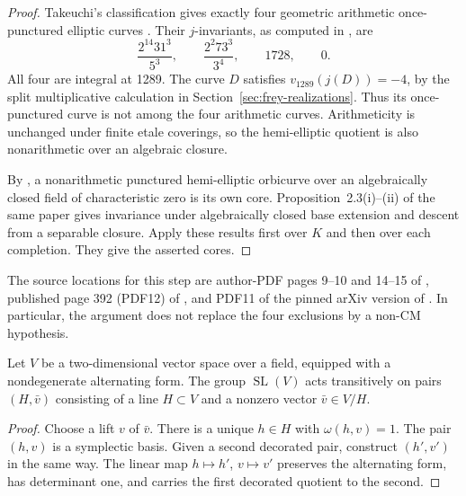 \begin{proof}
Takeuchi's classification gives exactly four geometric arithmetic
once-punctured elliptic curves
\cite[Theorem~4.1(i)]{TakeuchiFuchsian}. Their $j$-invariants, as
computed in \cite[Section~3.1, Table~4]{SijslingCanonical}, are
\begin{equation}\label{eq:itd-four}
 \frac{2^{14}31^3}{5^3},\qquad
 \frac{2^2 73^3}{3^4},\qquad1728,\qquad0.
\end{equation}
All four are integral at 1289. The curve $D$ satisfies
$v_{1289}(j(D))=-4$, by the split multiplicative calculation in
Section~\ref{sec:frey-realizations}. Thus its once-punctured curve
is not among the four arithmetic curves. Arithmeticity is
unchanged under finite etale coverings, so the hemi-elliptic
quotient is also nonarithmetic over an algebraic closure.

By \cite[Proposition~2.7]{MochCanLift}, a nonarithmetic punctured
hemi-elliptic orbicurve over an algebraically closed field of
characteristic zero is its own core.
Proposition~2.3(i)--(ii) of the same paper gives invariance under
algebraically closed base extension and descent from a separable
closure. Apply these results first over $K$ and then over each
completion. They give the asserted cores.
\end{proof}

The source locations for this step are author-PDF pages 9--10 and
14--15 of \cite{MochCanLift}, published page 392 (PDF12) of
\cite{TakeuchiFuchsian}, and PDF11 of the pinned arXiv version of
\cite{SijslingCanonical}. In particular, the argument does not
replace the four exclusions by a non-CM hypothesis.

\begin{lemma}\label{lem:itd-decorated}
Let $V$ be a two-dimensional vector space over a field, equipped
with a nondegenerate alternating form. The group
$\operatorname{SL}(V)$ acts transitively on pairs $(H,\bar v)$
consisting of a line $H\subset V$ and a nonzero vector
$\bar v\in V/H$.
\end{lemma}

\begin{proof}
Choose a lift $v$ of $\bar v$. There is a unique $h\in H$ with
$\omega(h,v)=1$. The pair $(h,v)$ is a symplectic basis. Given a
second decorated pair, construct $(h',v')$ in the same way. The
linear map $h\mapsto h'$, $v\mapsto v'$ preserves the alternating
form, has determinant one, and carries the first decorated quotient
to the second.
\end{proof}

